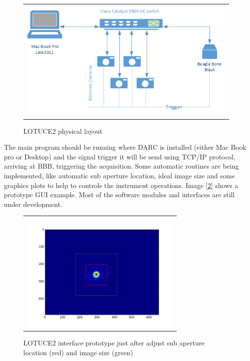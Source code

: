 \documentclass[]{spie}  %
\begin{document}
   \begin{figure}[!ht]
   \begin{center}
   \begin{tabular}{c}
   \includegraphics[height=6.0cm]{../img/physical_layout_lotuce.png}
   \end{tabular}
   \end{center}
   \caption[lpl] 
   { \label{fig:lpl} LOTUCE2 physical layout}
   \end{figure} 

The main program should be running where DARC is installed (either Mac Book pro
        or Desktop) and the signal trigger it will be send using TCP/IP
protocol, arriving at BBB, triggering the acquisition. Some automatic routines
are being implemented, like automatic sub aperture location, ideal image size
and some graphics plots to help to controls the instrument operations. Image
[\ref{fig:step2}] shows a prototype GUI example. Most of the software modules
and interfaces are still under development.

   \begin{figure}[!ht]
   \begin{center}
   \begin{tabular}{c}
   \includegraphics[height=6.0cm]{../img/step2b.png}
   \end{tabular}
   \end{center}
   \caption[step2] 
   { \label{fig:step2} LOTUCE2 interface prototype just after adjust sub aperture location (red) and image size (green)}
   \end{figure} 
\end{document}
